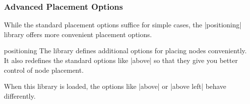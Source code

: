 \subsubsection{Advanced Placement Options}

While the standard placement options suffice for simple cases, the
|positioning| library offers more convenient placement options.

\begin{tikzlibrary}{positioning}
    The library defines additional options for placing nodes conveniently. It
    also redefines the standard options like |above| so that they give you
    better control of node placement.
\end{tikzlibrary}

When this library is loaded, the options like |above| or |above left| behave
differently.

